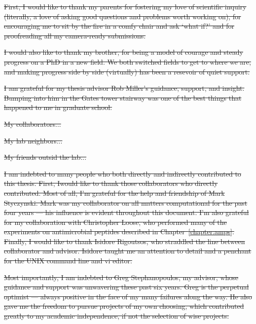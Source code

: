 \documentclass[12pt,twoside]{mitthesis}
\providecommand{\DIFdeltex}[1]{{\protect\color{red}\sout{#1}}}                      %
\providecommand{\DIFdel}[1]{\texorpdfstring{\DIFdeltex{#1}}{}} %
\begin{document}

\DIFdel{First, I would like to thank my parents for fostering my love of scientific inquiry (literally, a love of asking good questions and problems worth working on), for encouraging me to sit by the fire in a comfy chair and ask `what if?' and for proofreading all my camera-ready submissions. }%

\DIFdel{I would also like to thank my brother, for being a model of courage and steady progress on a PhD in a new field. We both switched fields to get to where we are, and making progress side by side (virtually) has been a resevoir of quiet support.
}%

\DIFdel{I am grateful for my thesis advisor Rob Miller's guidance, support, and insight. Bumping into him in the Gates tower stairway was one of the best things that happened to me in graduate school. 
}%

\DIFdel{My collaborators...
}%

\DIFdel{My lab neighbors...
}%

\DIFdel{My friends outsid the lab...
}%

\DIFdel{I am indebted to many people who both directly and indirectly
contributed to this thesis. First, Iwould like to thank those
collaborators who directly contributed.  Most of all, I'm grateful
for the help and friendship of Mark Styczynski. Mark was my
collaborator on all matters computational for the past four years
--- his influence is evident throughout this document.  I'm also grateful for my collaboration with Christopher Loose, who performed
many of the experiments on antimicrobial peptides described in
Chapter~\ref{chapter:amps}.  Finally, I would like to thank Isidore Rigoutsos, who
straddled the line between collaborator and advisor.  Isidore taught
me an attention to detail and a penchant for the UNIX command line
and vi editor.
}%

\DIFdel{Most importantly, I am indebted to Greg Stephanopoulos, my advisor,
whose guidance and support was unwavering these past six years. Greg
is the perpetual optimist --- always positive in the face of my many
failures along the way. He also gave me the freedom to pursue
projects of my own choosing, which contributed greatly to my
academic independence, if not the selection of wise projects.
}%
\end{document}
